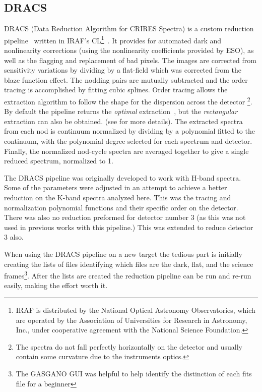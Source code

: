 \subsection{DRACS}
\label{subsec:dracs}
DRACS (Data Reduction Algorithm for CRIRES Spectra) is a custom reduction pipeline~\citep{figueira_radial_2010} written in IRAF's CL\footnote{IRAF is distributed by the National Optical Astronomy Observatories, which are operated by the Association of Universities for Research in Astronomy, {Inc.}, under cooperative agreement with the National Science Foundation.}~\citep{tody_iraf_1993}. It provides for automated dark and nonlinearity corrections (using the nonlinearity coefficients provided by ESO), as well as the flagging and replacement of bad pixels. The images are corrected from sensitivity variations by dividing by a flat-field which was corrected from the blaze function effect. The nodding pairs are mutually subtracted and the order tracing is accomplished by fitting cubic splines. Order tracing allows the extraction algorithm to follow the shape for the dispersion across the detector \footnote{The spectra do not fall perfectly horizontally on the detector and usually contain some curvature due to the instruments optics.}. 
By default the pipeline returns the \emph{optimal }extraction~\citep{horne_optimal_1986}, but the \emph{rectangular} extraction can also be obtained. (see  for more details).
The extracted spectra from each nod is continuum normalized by dividing by a polynomial fitted to the continuum, with the polynomial degree selected for each spectrum and detector. Finally, the normalized nod-cycle spectra are averaged together to give a single reduced spectrum, normalized to 1.

The DRACS pipeline was originally developed to work with H-band spectra. Some of the parameters were adjusted in an attempt to achieve a better reduction on the K-band spectra analyzed here. This was the tracing and normalization polynomial functions and their specific order on the detector. There was also no reduction preformed for detector number 3 (as this was not used in previous works with this pipeline.) This was extended to reduce detector 3 also. 

When using the DRACS pipeline on a new target the tedious part is initially creating the lists of files identifying which files are the dark, flat, and the science frames\footnote{The GASGANO GUI was helpful to help identify the distinction of each fits file for a beginner}. After the lists are created the reduction pipeline can be run and re-run easily, making the effort worth it. 

